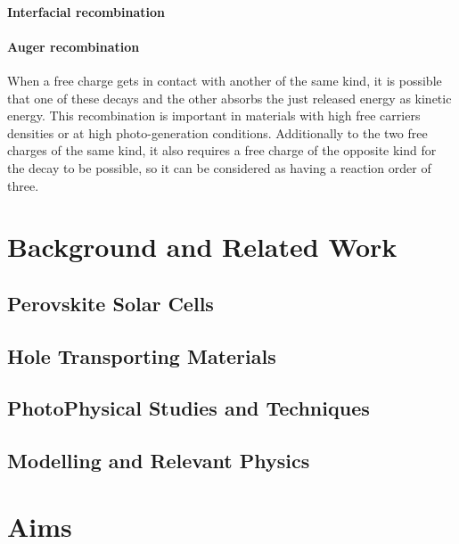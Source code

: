 \paragraph{Interfacial recombination} 

\paragraph{Auger recombination} When a free charge gets in contact with another of the same kind, it is possible that one of these decays and the other absorbs the just released energy as kinetic energy. This recombination is important in materials with high free carriers densities or at high photo-generation conditions. Additionally to the two free charges of the same kind, it also requires a free charge of the opposite kind for the decay to be possible, so it can be considered as having a reaction order of three.

\section{Background and Related Work}\label{sec:background}

\subsection{Perovskite Solar Cells}

\subsection{Hole Transporting Materials}

\subsection{PhotoPhysical Studies and Techniques}

\subsection{Modelling and Relevant Physics}


\section{Aims}